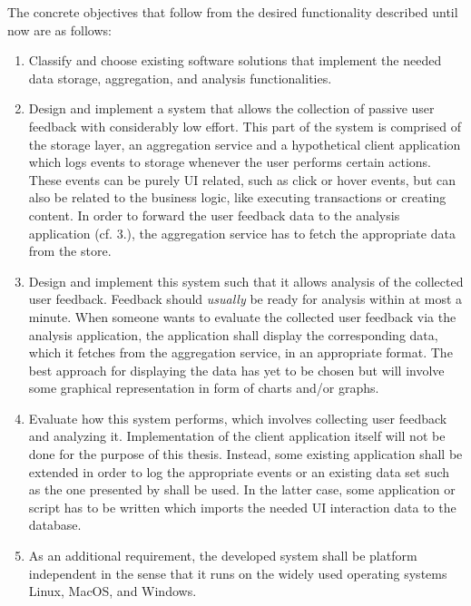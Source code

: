 The concrete objectives that follow from the desired functionality described until now are as follows:

\begin{enumerate}
\item Classify and choose existing software solutions that implement the needed data storage, aggregation, and analysis functionalities.
\item Design and implement a system that allows the collection of passive user feedback with considerably low effort.
This part of the system is comprised of the storage layer, an aggregation service and a hypothetical client application which logs events to storage whenever the user performs certain actions.
These events can be purely UI related, such as click or hover events, but can also be related to the business logic, like executing transactions or creating content.
In order to forward the user feedback data to the analysis application (cf. 3.), the aggregation service has to fetch the appropriate data from the store.
\item Design and implement this system such that it allows analysis of the collected user feedback.
Feedback should \emph{usually} be ready for analysis within at most a minute.
When someone wants to evaluate the collected user feedback via the analysis application, the application shall display the corresponding data, which it fetches from the aggregation service, in an appropriate format.
The best approach for displaying the data has yet to be chosen but will involve some graphical representation in form of charts and/or graphs.
\item Evaluate how this system performs, which involves collecting user feedback and analyzing it.
Implementation of the client application itself will not be done for the purpose of this thesis.
Instead, some existing application shall be extended in order to log the appropriate events or an existing data set such as the one presented by \citet{Deka:2017:Rico} shall be used.
In the latter case, some application or script has to be written which imports the needed UI interaction data to the database.
\item As an additional requirement, the developed system shall be platform independent in the sense that it runs on the widely used operating systems Linux, MacOS, and Windows.
\end{enumerate}

